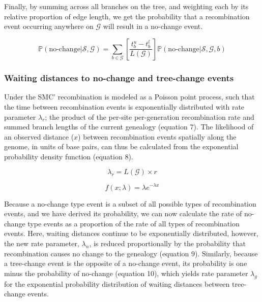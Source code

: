\documentclass[11pt]{article}
\begin{document}
\noindent Finally, by summing across all branches on the tree,
and weighting each by its relative proportion of edge length,
we get the probability that a recombination event occurring anywhere on 
$\mathcal{G}$ will result in a no-change event. %

\begin{equation}
	\mathbb{P}(\text{no-change} | \mathcal{S},\mathcal{G}) = 
	\sum_{b \in \mathcal{G}}
	\left[\frac{t^u_b - t^l_b}{L(\mathcal{G})}\right]
	\mathbb{P}(\text{no-change} | \mathcal{S},\mathcal{G},b)
\end{equation}


\subsubsection{Waiting distances to no-change and tree-change events}
Under the SMC' recombination is modeled as a Poisson point process, 
such that the time between recombination events is exponentially distributed 
with rate parameter $\lambda_r$; the product of the per-site
per-generation recombination rate and summed branch lengths of
the current genealogy \citep{wiuf_recombination_1999} (equation 7).
The likelihood of an observed distance ($x$) between recombination
events spatially along the genome, in units of base pairs, can thus 
be calculated from the exponential probability density function 
(equation 8).


\begin{equation}
	\lambda_{r} = L(\mathcal{G}) \times r
\end{equation}


\begin{equation}
	f(x; \lambda) = \lambda e^{-\lambda x}
\end{equation}

\noindent Because a no-change type event is a subset of all possible types of
recombination events, and we have derived its probability, we can now calculate 
the rate of no-change type events as a proportion of the rate of all types of 
recombination events. 
Here, waiting distances continue to be exponentially distributed, 
however, the new rate parameter, $\lambda_n$, is reduced proportionally by 
the probability that recombination causes no change to the genealogy
(equation 9). Similarly, because a tree-change event is the opposite 
of a no-change event, its probability is one minus the probability
of no-change (equation 10), which yields rate parameter $\lambda_g$ for 
the exponential probability distribution of waiting distances between 
tree-change events.
\end{document}
